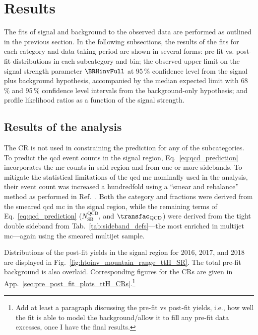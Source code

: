 \section{Results}
\label{sec:htoinv_results}

The fits of signal and background to the observed data are performed as outlined in the previous section. In the following subsections, the results of the fits for each category and data taking period are shown in several forms: pre-fit vs. post-fit distributions in each subcategory and \ptmiss bin; the observed upper limit on the signal strength parameter $\BRHinvFull$ at 95\,\% confidence level from the signal plus background hypothesis, accompanied by the median expected limit with 68\,\% and 95\,\% confidence level intervals from the background-only hypothesis; and profile likelihood ratios as a function of the signal strength.




\subsection{Results of the \texorpdfstring{\ttH}{ttH} analysis}
\label{subsec:htoinv_analysis_ttH}

The \singlePhotonCr \gls{CR} is not used in constraining the \ztonunu prediction for any of the subcategories. To predict the \acrshort{qcd} event counts in the signal region, Eq.~\ref{eq:qcd_prediction} incorporates the \acrshort{mc} counts in said region and from one or more sidebands. To mitigate the statistical limitations of the \acrshort{qcd} \acrshort{mc} nominally used in the analysis, their event count was increased a hundredfold using a ``smear and rebalance'' method as performed in Ref.~. Both the category and \ptmiss fractions were derived from the smeared \acrshort{qcd} \acrshort{mc} in the signal region, while the remaining terms of Eq.~\ref{eq:qcd_prediction} ($N_{\mathrm{SB}}^{\mathrm{QCD}}$, and $\transfac_{\mathrm{QCD}}$) were derived from the tight double sideband from Tab.~\ref{tab:sideband_defs}---the most enriched in multijet \acrshort{mc}---again using the smeared multijet sample.

Distributions of the post-fit yields in the signal region for 2016, 2017, and 2018 are displayed in Fig.~\ref{fig:htoinv_mountain_range_ttH_SR}. The total pre-fit background is also overlaid. Corresponding figures for the \glspl{CR} are given in App.~\ref{sec:pre_post_fit_plots_ttH_CRs}.\footnote{Add at least a paragraph discussing the pre-fit vs post-fit yields, i.e., how well the fit is able to model the background/allow it to fill any pre-fit data excesses, once I have the final results.}

